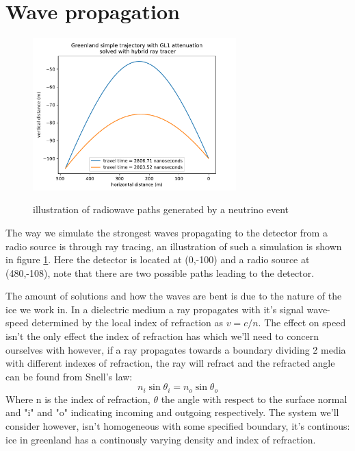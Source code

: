 \documentclass[11pt,a4paper,faculty=we,language=en,doctype=report]{cls/ugent-doc}
\begin{document}
\section{Wave propagation}
\begin{figure}[h!]
	\centering
	\includegraphics[width=0.7\textwidth]{path_illustration.pdf}
	\label{fig:PathIllu}
	\caption{illustration of radiowave paths generated by a neutrino event}
\end{figure}
The way we simulate the strongest waves propagating to the detector from a
radio source is through ray tracing, an illustration of such a simulation is
shown in figure \ref{fig:PathIllu}.  Here the detector is located at (0,-100)
and a radio source at (480,-108), note that there are two possible paths
leading to the detector.

The amount of solutions and how the waves are bent is due to the nature of the
ice we work in.  In a dielectric medium a ray propagates with it's signal
wave-speed determined by the local index of refraction as $v = c/n$.   The
effect on speed isn't the only effect the index of refraction has which we'll
need to concern ourselves with however, if a ray propagates towards a boundary
dividing 2 media with different indexes of refraction, the ray will refract and
the refracted angle can be found from Snell's law:
\begin{equation}
	n_i\sin{\theta_i} = n_o\sin{\theta_o}
\end{equation}
Where n is the index of refraction, $\theta$ the angle with respect to the
surface normal and "i" and "o" indicating incoming and outgoing respectively.
The system we'll consider however, isn't homogeneous with some specified
boundary, it's continous: ice in greenland has a continously varying density and
index of refraction.
\end{document}
